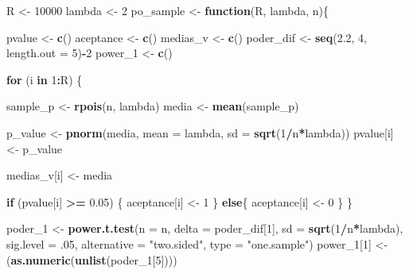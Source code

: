 \documentclass[11pt,]{article}
\newenvironment{Shaded}{\begin{snugshade}}{\end{snugshade}}
\newcommand{\ControlFlowTok}[1]{\textcolor[rgb]{0.13,0.29,0.53}{\textbf{#1}}}
\newcommand{\DataTypeTok}[1]{\textcolor[rgb]{0.13,0.29,0.53}{#1}}
\newcommand{\DecValTok}[1]{\textcolor[rgb]{0.00,0.00,0.81}{#1}}
\newcommand{\FloatTok}[1]{\textcolor[rgb]{0.00,0.00,0.81}{#1}}
\newcommand{\KeywordTok}[1]{\textcolor[rgb]{0.13,0.29,0.53}{\textbf{#1}}}
\newcommand{\NormalTok}[1]{#1}
\newcommand{\OperatorTok}[1]{\textcolor[rgb]{0.81,0.36,0.00}{\textbf{#1}}}
\newcommand{\StringTok}[1]{\textcolor[rgb]{0.31,0.60,0.02}{#1}}
\begin{document}
\begin{Shaded}
\begin{Highlighting}[]
\NormalTok{R <-}\StringTok{ }\DecValTok{10000}
\NormalTok{lambda <-}\StringTok{ }\DecValTok{2}
\NormalTok{po_sample <-}\StringTok{ }\ControlFlowTok{function}\NormalTok{(R, lambda, n)\{}

\NormalTok{  pvalue <-}\StringTok{ }\KeywordTok{c}\NormalTok{()}
\NormalTok{  aceptance <-}\StringTok{ }\KeywordTok{c}\NormalTok{()}
\NormalTok{  medias_v <-}\StringTok{ }\KeywordTok{c}\NormalTok{()}
\NormalTok{  poder_dif <-}\StringTok{ }\KeywordTok{seq}\NormalTok{(}\FloatTok{2.2}\NormalTok{, }\DecValTok{4}\NormalTok{, }\DataTypeTok{length.out =} \DecValTok{5}\NormalTok{)}\OperatorTok{-}\DecValTok{2}
\NormalTok{  power_}\DecValTok{1}\NormalTok{ <-}\StringTok{ }\KeywordTok{c}\NormalTok{()}

  \ControlFlowTok{for}\NormalTok{ (i }\ControlFlowTok{in} \DecValTok{1}\OperatorTok{:}\NormalTok{R) \{}

\NormalTok{    sample_p <-}\StringTok{ }\KeywordTok{rpois}\NormalTok{(n, lambda)}
\NormalTok{    media <-}\StringTok{ }\KeywordTok{mean}\NormalTok{(sample_p)}

\NormalTok{    p_value <-}\StringTok{ }\KeywordTok{pnorm}\NormalTok{(media, }\DataTypeTok{mean =}\NormalTok{ lambda, }\DataTypeTok{sd =} \KeywordTok{sqrt}\NormalTok{(}\DecValTok{1}\OperatorTok{/}\NormalTok{n}\OperatorTok{*}\NormalTok{lambda))}
\NormalTok{    pvalue[i] <-}\StringTok{ }\NormalTok{p_value}

\NormalTok{    medias_v[i] <-}\StringTok{ }\NormalTok{media}

    \ControlFlowTok{if}\NormalTok{ (pvalue[i] }\OperatorTok{>=}\StringTok{ }\FloatTok{0.05}\NormalTok{) \{}
\NormalTok{      aceptance[i] <-}\StringTok{ }\DecValTok{1}
\NormalTok{    \}}
    \ControlFlowTok{else}\NormalTok{\{}
\NormalTok{      aceptance[i] <-}\StringTok{ }\DecValTok{0}
\NormalTok{    \}}
\NormalTok{  \}}

\NormalTok{  poder_}\DecValTok{1}\NormalTok{ <-}\StringTok{ }\KeywordTok{power.t.test}\NormalTok{(}\DataTypeTok{n =}\NormalTok{ n, }\DataTypeTok{delta =}\NormalTok{ poder_dif[}\DecValTok{1}\NormalTok{],}
                          \DataTypeTok{sd =} \KeywordTok{sqrt}\NormalTok{(}\DecValTok{1}\OperatorTok{/}\NormalTok{n}\OperatorTok{*}\NormalTok{lambda),}
                          \DataTypeTok{sig.level =} \FloatTok{.05}\NormalTok{,}
                          \DataTypeTok{alternative =} \StringTok{"two.sided"}\NormalTok{,}
                          \DataTypeTok{type =} \StringTok{"one.sample"}\NormalTok{)}
\NormalTok{  power_}\DecValTok{1}\NormalTok{[}\DecValTok{1}\NormalTok{] <-}\StringTok{ }\NormalTok{(}\KeywordTok{as.numeric}\NormalTok{(}\KeywordTok{unlist}\NormalTok{(poder_}\DecValTok{1}\NormalTok{[}\DecValTok{5}\NormalTok{])))}


\end{Highlighting}
\end{Shaded}
\end{document}
